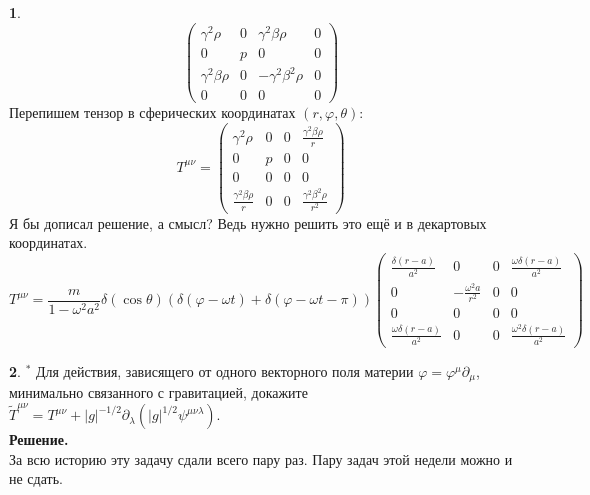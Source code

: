 \documentclass[12pt]{article}
\theoremstyle{definition}
\newtheorem{zad}{}[section]
\begin{document}
\begin{zad}
\begin{equation}
\begin{pmatrix}
    \gamma^2\rho & 0 & \gamma^2\beta\rho & 0\\
    0 & p & 0 & 0\\
    \gamma^2\beta\rho & 0 & -\gamma^2\beta^2\rho & 0\\
    0 & 0 & 0 & 0
    \end{pmatrix}
\end{equation}
Перепишем тензор в сферических координатах $(r,\varphi,\theta)$:
\begin{equation}
     T^{\mu\nu}=\begin{pmatrix}
    \gamma^2\rho & 0 & 0 & \frac{\gamma^2\beta\rho}{r}\\
    0 & p & 0 & 0\\
    0 & 0 & 0 & 0\\
    \frac{\gamma^2\beta\rho}{r} & 0 & 0 & \frac{\gamma^2\beta^2\rho}{r^2}
    \end{pmatrix}
\end{equation}
Я бы дописал решение, а смысл? Ведь нужно решить это ещё и в декартовых координатах.
\begin{equation}
    \boxed{T^{\mu\nu}=\frac{m}{1-\omega^2a^2}\delta(\cos\theta)(\delta(\varphi-\omega t)+\delta(\varphi-\omega t-\pi))
    \begin{pmatrix}
    \frac{\delta(r-a)}{a^2} & 0 & 0 & \frac{\omega\delta(r-a)}{a^2}\\
    0 & -\frac{\omega^2 a}{r^2} & 0 & 0\\
    0 & 0 & 0 & 0\\
    \frac{\omega\delta(r-a)}{a^2} & 0 & 0 & \frac{\omega^2\delta(r-a)}{a^2}
    \end{pmatrix}}
\end{equation}
\end{zad}
\begin{zad}
\textbf{$^*$} Для действия, зависящего от одного векторного поля материи $\varphi = \varphi^\mu\partial_\mu$, минимально связанного с гравитацией, докажите $\tilde T^{\mu\nu}=T^{\mu\nu}+|g|^{-1/2}\partial_\lambda(|g|^{1/2}\psi^{\mu\nu\lambda})$.\\
\textbf{Решение.}\\
За всю историю эту задачу сдали всего пару раз. Пару задач этой недели можно и не сдать.
\end{zad}
\end{document}
